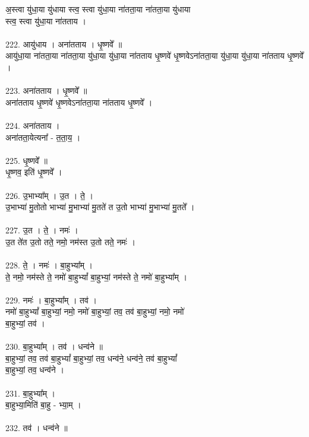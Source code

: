 अ॒स्त्वा यु॑धा॒या यु॑धाया स्त्व॒ स्त्वा यु॑धा॒या ना॑तता॒या ना॑तता॒या यु॑धाया\\
स्त्व॒ स्त्वा यु॑धा॒या ना॑तताय ।\\
\\
222. आयु॑धाय । अना॑तताय । धृ॒ष्णवे᳚ ॥\\
आयु॑धा॒या ना॑तता॒या ना॑तता॒या यु॑धा॒या यु॑धा॒या ना॑तताय धृ॒ष्णवे॑ धृ॒ष्णवेऽना॑तता॒या यु॑धा॒या यु॑धा॒या ना॑तताय धृ॒ष्णवे᳚ ।\\
\\
223. अना॑तताय । धृ॒ष्णवे᳚ ॥\\
अना॑तताय धृ॒ष्णवे॑ धृ॒ष्णवेऽना॑तता॒या ना॑तताय धृ॒ष्णवे᳚ ।\\
\\
224. अना॑तताय ।\\
अना॑तता॒येत्यना᳚ - त॒ता॒य॒ ।\\
\\
225. धृ॒ष्णवे᳚ ॥\\
धृ॒ष्णव॒ इति॑ धृ॒ष्णवे᳚ ।\\
\\
226. उ॒भाभ्या᳚म् । उ॒त । ते॒ ।\\
उ॒भाभ्या॑ मु॒तोतो भाभ्या॑ मु॒भाभ्या॑ मु॒तते॑ त उ॒तो भाभ्या॑ मु॒भाभ्या॑ मु॒तते᳚ ।\\
\\
227. उ॒त । ते॒ । नमः॑ ।\\
उ॒त ते॑त उ॒तो तते॒ नमो॒ नम॑स्त उ॒तो तते॒ नमः॑ ।\\
\\
228. ते॒ । नमः॑ । बा॒हुभ्या᳚म् ।\\
ते॒ नमो॒ नम॑स्ते ते॒ नमो॑ बा॒हुभ्यां᳚ बा॒हुभ्यां॒ नम॑स्ते ते॒ नमो॑ बा॒हुभ्या᳚म् ।\\
\\
229. नमः॑ । बा॒हुभ्या᳚म् । तव॑ ।\\
नमो॑ बा॒हुभ्यां᳚ बा॒हुभ्यां॒ नमो॒ नमो॑ बा॒हुभ्यां॒ तव॒ तव॑ बा॒हुभ्यां॒ नमो॒ नमो॑\\
बा॒हुभ्यां॒ तव॑ ।\\
\\
230. बा॒हुभ्या᳚म् । तव॑ । धन्व॑ने ॥\\
बा॒हुभ्यां॒ तव॒ तव॑ बा॒हुभ्यां᳚ बा॒हुभ्यां॒ तव॒ धन्व॑ने॒ धन्व॑ने॒ तव॑ बा॒हुभ्यां᳚\\
बा॒हुभ्यां॒ तव॒ धन्व॑ने ।\\
\\
231. बा॒हुभ्या᳚म् ।\\
बा॒हुभ्या॒मिति॑ बा॒हु - भ्या॒म् ।\\
\\
232. तव॑ । धन्व॑ने ॥\\

